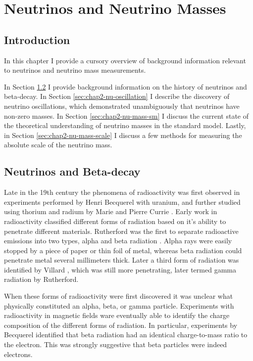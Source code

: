 
\chapter{Neutrinos and Neutrino Masses}

\section{Introduction}

In this chapter I provide a cursory overview of background information relevant to neutrinos and neutrino mass measurements. 

In Section \ref{sec:chap2-nu-history} I provide background information on the history of neutrinos and beta-decay. In Section \ref{sec:chap2-nu-oscillation} I describe the discovery of neutrino oscillations, which demonstrated unambiguously that neutrinos have non-zero masses. In Section \ref{sec:chap2-nu-mass-sm} I discuss the current state of the theoretical understanding of neutrino masses in the standard model. Lastly, in Section \ref{sec:chap2-nu-mass-scale} I discuss a few methods for measuring the absolute scale of the neutrino mass.

\section{Neutrinos and Beta-decay}
\label{sec:chap2-nu-history}
Late in the 19th century the phenomena of radioactivity was first observed in experiments performed by Henri Becquerel with uranium, and further studied using thorium and radium by Marie and Pierre Currie \cite{nuclear_physics, curie}. Early work in radioactivity classified different forms of radiation based on it's ability to penetrate different materials. Rutherford was the first to separate radioactive emissions into two types, alpha and beta radiation \cite{rutherford_rad_types}. Alpha rays were easily stopped by a piece of paper or thin foil of metal, whereas beta radiation could penetrate metal several millimeters thick. Later a third form of radiation was identified by Villard \cite{villard}, which was still more penetrating, later termed gamma radiation by Rutherford. 

When these forms of radioactivity were first discovered it was unclear what physically constituted an alpha, beta, or gamma particle. Experiments with radioactivity in magnetic fields ware eventually able to identify the charge composition of the different forms of radiation. In particular, experiments by Becquerel identified \cite{Becquerel_beta_electron} that beta radiation had an identical charge-to-mass ratio to the electron. This was strongly suggestive that beta particles were indeed electrons.


